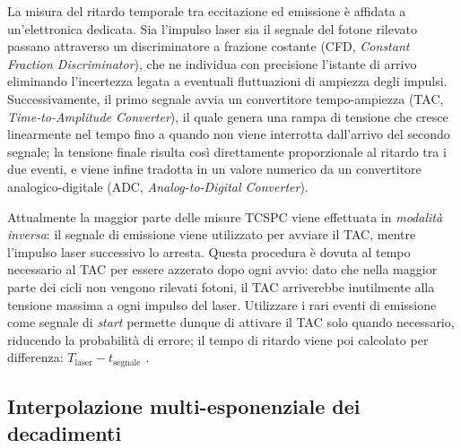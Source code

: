 La misura del ritardo temporale tra eccitazione ed emissione è affidata a un'elettronica dedicata. Sia l'impulso laser sia il segnale del fotone rilevato passano attraverso un discriminatore a frazione costante (CFD, \textit{Constant Fraction Discriminator}), che ne individua con precisione l'istante di arrivo eliminando l'incertezza legata a eventuali fluttuazioni di ampiezza degli impulsi. Successivamente, il primo segnale avvia un convertitore tempo-ampiezza (TAC, \textit{Time-to-Amplitude Converter}), il quale genera una rampa di tensione che cresce linearmente nel tempo fino a quando non viene interrotta dall'arrivo del secondo segnale; la tensione finale risulta così direttamente proporzionale al ritardo tra i due eventi, e viene infine tradotta in un valore numerico da un convertitore analogico-digitale (ADC, \textit{Analog-to-Digital Converter}).

Attualmente la maggior parte delle misure TCSPC viene effettuata in \textit{modalità inversa}: il segnale di emissione viene utilizzato per avviare il TAC, mentre l'impulso laser successivo lo arresta. Questa procedura è dovuta al tempo necessario al TAC per essere azzerato dopo ogni avvio: dato che nella maggior parte dei cicli non vengono rilevati fotoni, il TAC arriverebbe inutilmente alla tensione massima a ogni impulso del laser. Utilizzare i rari eventi di emissione come segnale di \textit{start} permette dunque di attivare il TAC solo quando necessario, riducendo la probabilità di errore; il tempo di ritardo viene poi calcolato per differenza: $T_{\text{laser}}-t_{\text{segnale}}$ \cite[Sez.~4.3.1]{lakowiczPrinciplesFluorescenceSpectroscopy2006}.



\subsection{Interpolazione multi-esponenziale dei decadimenti} %

